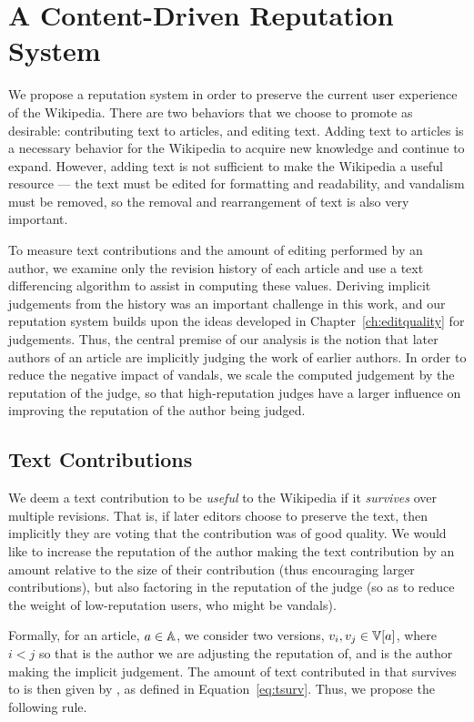 \section{A Content-Driven Reputation System} 

We propose a  reputation system in
order to preserve the current user experience of the Wikipedia.
There are two behaviors that we choose to promote as desirable:
contributing text to articles, and editing text.
Adding text to articles is a necessary behavior for the Wikipedia
to acquire new knowledge and continue to expand.
However, adding text is not sufficient to make the Wikipedia a
useful resource --- the text must be edited for formatting and
readability, and vandalism must be removed, so the removal and
rearrangement of text is also very important.

To measure text contributions and the amount of editing performed
by an author, we examine only the revision history of each article
and use a text differencing algorithm to assist in computing these values.
Deriving implicit judgements from the history was an important
challenge in this work, and our reputation system builds upon
the ideas developed in Chapter~\ref{ch:editquality} for judgements.
Thus, the central premise of our analysis is the notion that later
authors of an article are implicitly judging the work of earlier authors.
In order to reduce the negative impact of vandals, we scale the
computed judgement by the reputation of the judge, so that high-reputation
judges have a larger influence on improving the reputation of the
author being judged.

\subsection{Text Contributions} 

We deem a text contribution to be \textit{useful} to the Wikipedia
if it \textit{survives} over multiple revisions.
That is, if later editors choose to preserve the text, then
implicitly they are voting that the contribution was of good
quality.
We would like to increase the reputation of the author making
the text contribution by an amount relative to the size of their
contribution (thus encouraging larger contributions),
but also factoring in the reputation of the judge (so as to reduce
the weight of low-reputation users, who might be vandals).

Formally, for an article, $a \in \mathbb{A}$,
we consider two versions, $\version{i}, \version{j} \in \versions{a}$,
where $i < j$ so that  is the author we are
adjusting the reputation of, and  is the author
making the implicit judgement.
The amount of text contributed in  that survives
to  is then given by , as defined in
Equation~\ref{eq:tsurv}.
Thus, we propose the following rule.

